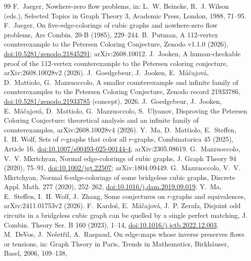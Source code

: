 {\sloppy
\begin{thebibliography}{99}
 F.~Jaeger, Nowhere-zero flow problems, in: L.~W. Beineke, R.~J. Wilson
(eds.), Selected Topics in Graph Theory 3, Academic Press, London, 1988, 71--95.
 F.~Jaeger, On five-edge-colorings of cubic graphs and nowhere-zero flow problems,
Ars Combin. 20-B (1985), 229--244.
 B.~Putman, A 112-vertex counterexample to the Petersen Coloring Conjecture,
Zenodo v1.1.0 (2026), \href{https://doi.org/10.5281/zenodo.21845291}{doi:10.5281/zenodo.21845291};
arXiv:2608.10012.
 J.~Jooken, A human-checkable proof of the 112-vertex counterexample to the Petersen
coloring conjecture, arXiv:2608.10028v2 (2026).
 J.~Goedgebeur, J.~Jooken, E.~M\'a\v{c}ajov\'a, D.~Mattiolo, G.~Mazzuoccolo, A smaller
counterexample and infinite family of counterexamples to the Petersen Coloring Conjecture, Zenodo record
21933786, \href{https://doi.org/10.5281/zenodo.21933785}{doi:10.5281/zenodo.21933785} (concept), 2026.
 J.~Goedgebeur, J.~Jooken, E.~M\'a\v{c}ajov\'a, D.~Mattiolo, G.~Mazzuoccolo,
S.~Ulyanov, Disproving the Petersen Coloring Conjecture: theoretical analysis and an infinite
family of counterexamples, arXiv:2608.10028v4 (2026).
 Y.~Ma, D.~Mattiolo, E.~Steffen, I.~H. Wolf, Sets of $r$-graphs that color all
$r$-graphs, Combinatorica 45 (2025), Article 16,
\href{https://doi.org/10.1007/s00493-025-00144-4}{doi:10.1007/s00493-025-00144-4}; arXiv:2305.08619.
 G.~Mazzuoccolo, V.~V. Mkrtchyan, Normal edge-colorings of cubic graphs,
J. Graph Theory 94 (2020), 75--91, \href{https://doi.org/10.1002/jgt.22507}{doi:10.1002/jgt.22507};
arXiv:1804.09449.
 G.~Mazzuoccolo, V.~V. Mkrtchyan, Normal 6-edge-colorings of some
bridgeless cubic graphs, Discrete Appl. Math. 277 (2020), 252--262,
\href{https://doi.org/10.1016/j.dam.2019.09.019}{doi:10.1016/j.dam.2019.09.019}.
 Y.~Ma, E.~Steffen, I.~H. Wolf, J.~Zhang, Some conjectures on $r$-graphs and equivalences,
arXiv:2411.01753v2 (2026).
 F.~Kardo\v{s}, E.~M\'a\v{c}ajov\'a, J.~P. Zerafa, Disjoint odd circuits in a bridgeless cubic graph can
be quelled by a single perfect matching, J. Combin. Theory Ser. B 160 (2023), 1--14,
\href{https://doi.org/10.1016/j.jctb.2022.12.003}{doi:10.1016/j.jctb.2022.12.003}.
 M.~DeVos, J.~Ne\v{s}et\v{r}il, A.~Raspaud, On edge-maps whose inverse preserves flows or tensions,
in: Graph Theory in Paris, Trends in Mathematics, Birkh\"auser, Basel, 2006, 109--138,

\end{thebibliography}}
